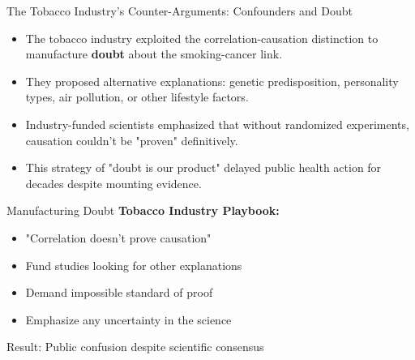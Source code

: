 \documentclass{beamer}
\begin{document}
	\begin{frame}{The Tobacco Industry's Counter-Arguments: Confounders and Doubt}
		\begin{itemize}
			\item The tobacco industry exploited the correlation-causation distinction to manufacture \textbf{doubt} about the smoking-cancer link.
			\item They proposed alternative explanations: genetic predisposition, personality types, air pollution, or other lifestyle factors.
			\item Industry-funded scientists emphasized that without randomized experiments, causation couldn't be "proven" definitively.
			\item This strategy of "doubt is our product" delayed public health action for decades despite mounting evidence.
		\end{itemize}
		
		\begin{block}{Manufacturing Doubt}
			\scriptsize
			\textbf{Tobacco Industry Playbook:}
			\begin{itemize}
				\item "Correlation doesn't prove causation"
				\item Fund studies looking for other explanations
				\item Demand impossible standard of proof
				\item Emphasize any uncertainty in the science
			\end{itemize}
			Result: Public confusion despite scientific consensus
		\end{block}
	\end{frame}
	
\end{document}
